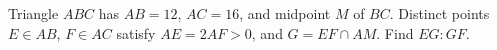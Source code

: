 Triangle $ABC$ has $AB=12$, $AC=16$, and midpoint $M$ of $BC$. Distinct points $E\in AB$, $F\in AC$ satisfy $AE=2AF>0$, and $G=EF\cap AM$. Find $EG:GF$.
